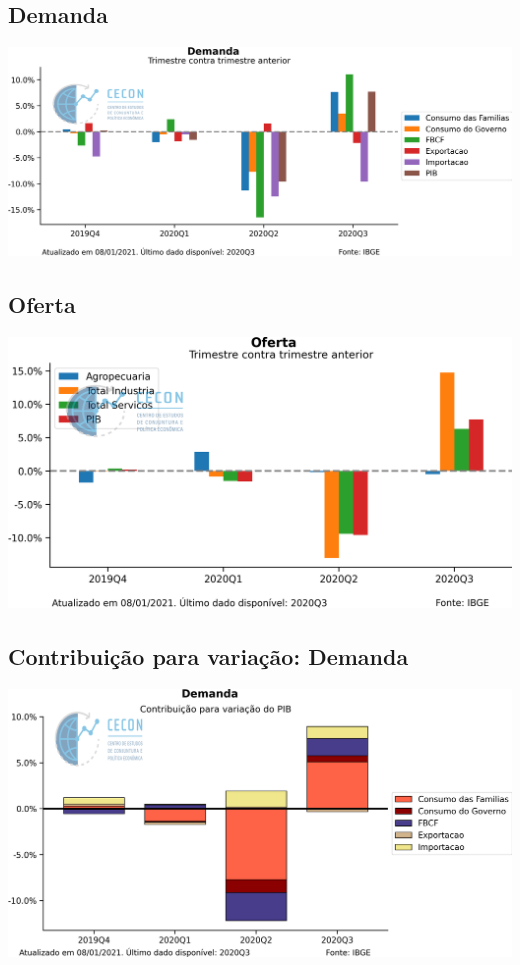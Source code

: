 \documentclass{SelfArx}
\begin{document}
\subsection*{Demanda}
\label{sec:org5c86daf}

\begin{center}
\includegraphics[width=.9\linewidth]{./figs/PIB/Demanda.png}
\end{center}

\subsection*{Oferta}
\label{sec:org9f15594}


\begin{center}
\includegraphics[width=.9\linewidth]{./figs/PIB/Oferta.png}
\end{center}


\subsection*{Contribuição para variação: Demanda}
\label{sec:orgbf0e6e4}

\begin{center}
\includegraphics[width=.9\linewidth]{./figs/PIB/Contrib_Demanda.png}
\end{center}
\end{document}
